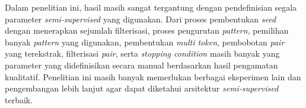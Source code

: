 Dalam penelitian ini, hasil masih sangat tergantung dengan pendefinisian segala parameter \textit{semi-supervised} yang digunakan. Dari proses pembentukan \textit{seed} dengan menerapkan sejumlah filterisasi, proses pengurutan \textit{pattern}, pemilihan banyak \textit{pattern} yang digunakan, pembentukan \textit{multi token}, pembobotan \textit{pair} yang terekstrak, filterisasi \textit{pair}, serta \textit{stopping condition} masih banyak yang parameter yang didefinisikan secara manual berdasarkan hasil pengamatan kualitatif. Penelitian ini masih banyak memerlukan berbagai eksperimen lain dan pengembangan lebih lanjut agar dapat diketahui arsitektur \textit{semi-supervised} terbaik. 
